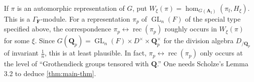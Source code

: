\documentclass{article}
\DeclareMathOperator{\GL}{GL}
\DeclareMathOperator{\reciprocity}{rec}
\newcommand{\finite}{\mathrm{f}}
\newcommand{\dA}{\mathbf{A}}
\newcommand{\dF}{\mathbf{F}}
\newcommand{\dQ}{\mathbf{Q}}
\begin{document}
If $\pi$ is an automorphic representation of $G$, put 
$W_\xi(\pi) = \hom_{G(\dA_\finite)}(\pi_\finite, H_\xi)$. This is a 
$\Gamma_\dF$-module. For a representation $\pi_p$ of $\GL_n(F)$ of the special 
type specified above, the correspondence 
$\pi_p\leftrightarrow \reciprocity(\pi_p)$ roughly occurs in 
$W_\xi(\pi)$ for some $\xi$. Since 
$G(\dQ_p) = \GL_n(F)\times D^\times \times \dQ_p^\times$ for the division 
algebra $D_{/\dQ_p}$ of invariant $\frac 1 n$, this is at least plausible. In 
fact, $\pi_p\leftrightarrow \reciprocity(\pi_p)$ only occurs at the level of 
``Grothendieck groups tensored with $\dQ$.'' One needs Scholze's Lemma 3.2 to 
deduce \autoref{thm:main-thm}. 





\printbibliography
\end{document}
